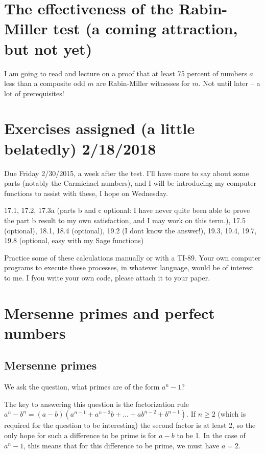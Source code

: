 \documentclass[12pt]{article}
\begin{document}
\section{The effectiveness of the Rabin-Miller test (a coming attraction, but not yet)}

I am going to read and lecture on a proof that at least 75 percent of numbers $a$ less than a composite odd $m$ are Rabin-Miller witnesses for $m$.  Not until later -- a lot of prerequisites!




\section{Exercises  assigned (a little belatedly)  2/18/2018}

Due Friday 2/30/2015, a week after the test.  I'll have more to say about some parts (notably the Carmichael numbers), and I will be introducing my computer functions to assist with these, I hope on Wednesday.

17.1, 17.2, 17.3a (parts b and c optional:  I have never quite been able to prove the part b result to my own satisfaction, and I may work on this term.), 17.5 (optional), 18.1, 18.4 (optional), 19.2 (I dont know the answer!), 19.3, 19.4, 19.7, 19.8 (optional, easy with my Sage functions)

Practice some of these calculations manually or with a TI-89.   Your own computer programs to execute these processes, in whatever language, would be of interest to me.  I fyou write your own code, please attach it to your paper.

\section{Mersenne primes and perfect numbers}

\subsection{Mersenne primes}

We ask the question, what primes are of the form $a^n-1$?

The key to answering this question is the factorization rule $a^n-b^n=(a-b)(a^{n-1}+a^{n-2}b+\ldots+ab^{n-2}+b^{n-1})$.  If $n\geq 2$ (which is required for the question to be interesting) the second factor is at least 2,
so the only hope for such a difference to be prime is for $a-b$ to be 1.   In the case of $a^n-1$, this means that for this difference to be prime, we must have $a=2$.
\end{document}
